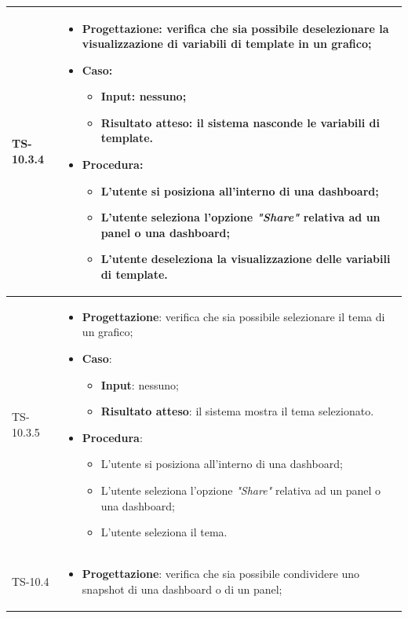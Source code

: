 \begin{longtable}{|C{2.5cm}|C{13cm}|}
	{TS-10.3.4} &
\begin{itemize}
	\item \textbf{Progettazione}: verifica che sia  possibile deselezionare la
	visualizzazione di variabili di template in un grafico;
	\item \textbf{Caso}: 
	\begin{itemize}
		\item \textbf{Input}: nessuno;
		\item \textbf{Risultato atteso}: il sistema nasconde le variabili di template.
	\end{itemize}
	\item \textbf{Procedura}:
	\begin{itemize}
		\item L'utente si posiziona all'interno di una dashboard;
		\item L'utente seleziona l'opzione \emph{"Share"} relativa ad un panel o una dashboard;
		\item L'utente deseleziona la visualizzazione delle variabili di template.
	\end{itemize} 
\end{itemize}
	  \\
	\hline
	{TS-10.3.5} &
\begin{itemize}
	\item \textbf{Progettazione}: verifica che sia possibile selezionare il
	tema di un grafico;
	\item \textbf{Caso}: 
	\begin{itemize}
		\item \textbf{Input}: nessuno;
		\item \textbf{Risultato atteso}: il sistema mostra il tema selezionato.
	\end{itemize}
	\item \textbf{Procedura}:
	\begin{itemize}
		\item L'utente si posiziona all'interno di una dashboard;
		\item L'utente seleziona l'opzione \emph{"Share"} relativa ad un panel o una dashboard;
		\item L'utente seleziona il tema.
	\end{itemize} 
\end{itemize}
	  \\
	\hline
	{TS-10.4} & 
\begin{itemize}
	\item \textbf{Progettazione}: verifica che sia possibile condividere uno
	snapshot di una dashboard o di un panel;

\end{itemize}
\end{longtable}
